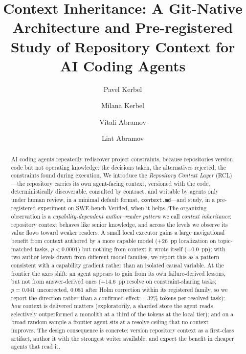 \documentclass[sigconf,screen]{acmart}
\newcommand{\ctx}{\texttt{context.md}}
\begin{document}
\title{Context Inheritance: A Git-Native Architecture and Pre-registered Study
of Repository Context for AI Coding Agents}

\author{Pavel Kerbel}
\correspondingauthor
{}
\author{Milana Kerbel}
\author{Vitali Abramov}
\author{Liat Abramov}

\begin{abstract}
AI coding agents repeatedly rediscover project constraints, because repositories
version code but not operating knowledge: the decisions taken, the alternatives
rejected, the constraints found during execution. We introduce the
\emph{Repository Context Layer} (RCL)---the repository carries its own agent-facing
context, versioned with the code, deterministically discoverable, consulted by
contract, and writable by agents only under human review, in a minimal default
format, \ctx{}---and study, in a pre-registered experiment on SWE-bench Verified,
when it helps. The organizing observation is a \emph{capability-dependent
author--reader pattern} we call \emph{context inheritance}: repository context
behaves like senior knowledge, and across the levels we observe its value flows
toward weaker readers. A small local executor gains a large navigational benefit
from context authored by a more capable model (+26~pp localization on
topic-matched tasks, $p < 0.0001$) but nothing from context it wrote itself
($+0.0$~pp); with two author levels drawn from different model families, we
report this as a pattern consistent with a capability gradient rather than an
isolated causal variable. At the frontier the axes shift: an agent
appears to gain from its own failure-derived lessons, but not from answer-derived
ones (+14.6~pp resolve on constraint-sharing tasks; $p = 0.041$ uncorrected,
$0.081$ after Holm correction within its registered family, so we report the
direction rather than a confirmed effect; $-32\%$ tokens per resolved task); \emph{how}
context is delivered matters (exploratorily, a sharded store the agent reads
selectively outperformed a monolith at a third of the tokens at the local tier);
and on a broad
random sample a frontier agent sits at a resolve ceiling that no context improves.
The design consequence is concrete: version repository context as a first-class
artifact, author it with the strongest writer available, and expect the benefit in
cheaper agents that read it.
\end{abstract}
\end{document}
